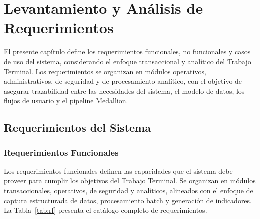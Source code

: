 \section{Levantamiento y Análisis de Requerimientos}

El presente capítulo define los requerimientos funcionales, no funcionales y casos de uso
del sistema, considerando el enfoque transaccional y analítico del Trabajo Terminal. Los
requerimientos se organizan en módulos operativos, administrativos, de seguridad y de
procesamiento analítico, con el objetivo de asegurar trazabilidad entre las necesidades
del sistema, el modelo de datos, los flujos de usuario y el pipeline Medallion.

\subsection{Requerimientos del Sistema}

\subsubsection{Requerimientos Funcionales}

Los requerimientos funcionales definen las capacidades que el sistema debe proveer
para cumplir los objetivos del Trabajo Terminal. Se organizan en módulos transaccionales,
operativos, de seguridad y analíticos, alineados con el enfoque de captura estructurada
de datos, procesamiento batch y generación de indicadores. La Tabla~\ref{tab:rf} presenta
el catálogo completo de requerimientos.

